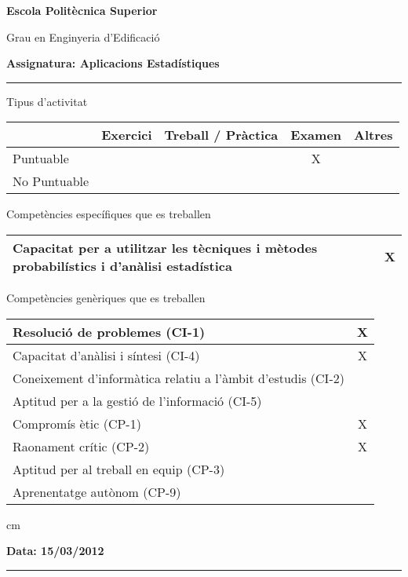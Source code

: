 \documentclass[a4paper,10pt]{article}
\begin{document}
\noindent
{\large \bf Escola Politècnica Superior}

\noindent
{\large Grau en Enginyeria d'Edificació}

\vskip 0.3cm
\noindent
{\large \bf Assignatura: Aplicacions Estadístiques}

\hrule

\vskip 0.3cm

\noindent
Tipus d'activitat

\begin{tabular}{|l|c|c|c|c|}
\hline
 & Exercici & Treball / Pràctica & Examen & Altres \\
\hline
Puntuable & & & X & \\ \hline
No Puntuable & & & & \\ \hline
\end{tabular}

\vskip 0.3cm

\noindent
Competències específiques que es treballen

\begin{tabular}{|l|c|}
\hline
Capacitat per a utilitzar les tècniques i mètodes probabilístics i d'anàlisi estadística & X \\
\hline
\end{tabular}

\vskip 0.3cm

\noindent
Competències genèriques que es treballen

\begin{tabular}{|l|c|}
\hline
Resolució de problemes (CI-1) & X \\ \hline
Capacitat d'anàlisi i síntesi (CI-4) & X \\ \hline
Coneixement d'informàtica relatiu a l'àmbit d'estudis (CI-2) & \\ \hline
Aptitud per a la gestió de l'informació (CI-5) & \\ \hline
Compromís ètic (CP-1) & X \\ \hline
Raonament crític (CP-2) & X \\ \hline
Aptitud per al treball en equip (CP-3) & \\ \hline
Aprenentatge autònom (CP-9) & \\ \hline
\end{tabular}


 cm

\noindent
\textbf{Data: 15/03/2012}

\hrule

\vspace{0.3 cm}
\end{document}
